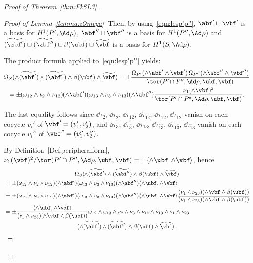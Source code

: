 \begin{proof}[Proof of Theorem~\ref{thm:FkSL3}]
\begin{proof}[Proof of Lemma~\ref{lemma:iOmega}]
Then, by using~\eqref{eqn:lesp'p''}, $\abf'\sqcup \vbf'$ is a basis for $H^1(P',\Ad\rho)$, $\abf''\sqcup \vbf''$ is a basis for $H^1(P'',\Ad\rho)$ and $\widetilde{(\abf')}\sqcup \widetilde{(\abf'')}\sqcup \beta (\ubf)\sqcup \widetilde{\vbf}$ is a basis for $H^1(S,\Ad\rho)$.


The product formula applied to~\eqref{eqn:lesp'p''} yields:
\begin{multline*}
\Omega_S(\wedge\widetilde{(\abf')}\wedge \widetilde{(\abf'')}\wedge\beta(\ubf)\wedge \widetilde{\vbf})=\pm
\frac{\Omega_{P'} (\wedge\abf' \wedge\vbf')\, \Omega_{P''} (\wedge\abf'' \wedge\vbf'') }{\tor(P'\cap P'',\Ad\rho,\ubf,\vbf)}
\\
=\pm (\omega_{12}\wedge\nu_2\wedge\nu_{12}) (\wedge\abf') (\omega_{13}\wedge\nu_3\wedge\nu_{13}) (\wedge\abf'')
\frac{\nu_1(\wedge\vbf)^2}{\tor(P'\cap P'',\Ad\rho,\ubf,\vbf)}.
\end{multline*}



The last equality follows since $\dd\tau_2$, $\dd\tau_{\bar{2}}$, $\dd\tau_{12}$, $\dd\tau_{\bar1\bar2}$, $\dd\tau_{1\bar2}$, $\dd\tau_{\bar1 2}$ vanish on each cocycle $v_i'$ of $\vbf'= (v_1',v_2')$, and $\dd\tau_3$, $\dd\tau_{\bar{3}}$, $\dd\tau_{13}$, $\dd\tau_{\bar1\bar3}$, $\dd\tau_{1\bar3}$, $\dd\tau_{\bar1 3}$ vanish on each cocycle $v_i''$ of $\vbf''= (v_1'',v_2'')$.


By Definition~\ref{Def:peripheralform}, $ {\nu_1(\vbf)^2}/{ \tor(P'\cap P'',\Ad\rho,\ubf,\vbf) } =
\pm\langle \wedge\ubf, \wedge\vbf \rangle $, hence
\begin{multline*}
\Omega_S(\wedge\widetilde{(\abf')}\wedge \widetilde{(\abf'')}\wedge\beta(\ubf)\wedge \widetilde{\vbf})\\
\begin{aligned}
&=\pm (\omega_{12}\wedge\nu_2\wedge\nu_{12}) (\wedge\abf') (\omega_{13}\wedge\nu_3\wedge\nu_{13}) (\wedge\abf'') \langle \wedge\ubf, \wedge\vbf \rangle\\
&=\pm (\omega_{12}\wedge\nu_2\wedge\nu_{12}) (\wedge\abf') (\omega_{13}\wedge\nu_3\wedge\nu_{13}) (\wedge\abf'') \langle \wedge\ubf, \wedge\vbf \rangle
\frac {(\nu_1 \wedge \nu_{23}) (\wedge\vbf\wedge\beta(\ubf)) }{(\nu_1 \wedge \nu_{23}) (\wedge\vbf\wedge\beta(\ubf)) }\\
&=\pm\frac{\langle \wedge\ubf, \wedge\vbf \rangle}{ (\nu_1 \wedge \nu_{23}) (\wedge\vbf\wedge\beta(\ubf)) }\omega_{12}\wedge \omega_{13} \wedge\nu_2\wedge\nu_3\wedge\nu_{12}\wedge\nu_{13} \wedge \nu_1\wedge \nu_{23}
\end{aligned}
\\
\bigl(\wedge\widetilde{(\abf')}\wedge\widetilde{(\abf'')} \wedge\beta(\ubf)\wedge\widetilde{\vbf} \big)\,.
\end{multline*}



\end{proof}
\end{proof}
